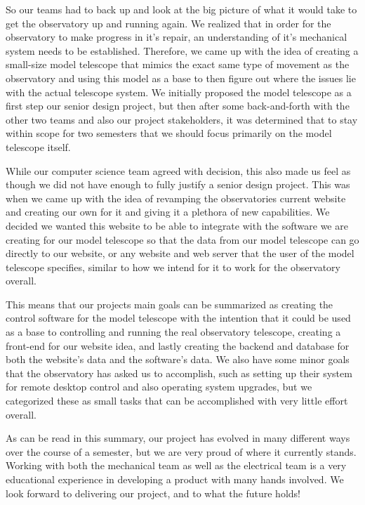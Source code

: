 \documentclass[12pt]{article}
\begin{document}
So our teams had to back up and look at the big picture of what it would take to get the observatory up and running again. We realized that in order for the observatory to make progress in it’s repair, an understanding of it’s mechanical system needs to be established. Therefore, we came up with the idea of creating a small-size model telescope that mimics the exact same type of movement as the observatory and using this model as a base to then figure out where the issues lie with the actual telescope system. We initially proposed the model telescope as a first step our senior design project, but then after some back-and-forth with the other two teams and also our project stakeholders, it was determined that to stay within scope for two semesters that we should focus primarily on the model telescope itself.

While our computer science team agreed with decision, this also made us feel as though we did not have enough to fully justify a senior design project. This was when we came up with the idea of revamping the observatories current website and creating our own for it and giving it a plethora of new capabilities. We decided we wanted this website to be able to integrate with the software we are creating for our model telescope so that the data from our model telescope can go directly to our website, or any website and web server that the user of the model telescope specifies, similar to how we intend for it to work for the observatory overall.

This means that our projects main goals can be summarized as creating the control software for the model telescope with the intention that it could be used as a base to controlling and running the real observatory telescope, creating a front-end for our website idea, and lastly creating the backend and database for both the website’s data and the software’s data. We also have some minor goals that the observatory has asked us to accomplish, such as setting up their system for remote desktop control and also operating system upgrades, but we categorized these as small tasks that can be accomplished with very little effort overall.

As can be read in this summary, our project has evolved in many different ways over the course of a semester, but we are very proud of where it currently stands. Working with both the mechanical team as well as the electrical team is a very educational experience in developing a product with many hands involved. We look forward to delivering our project, and to what the future holds!

\newpage

\printbibliography[title={References}]
\end{document}
